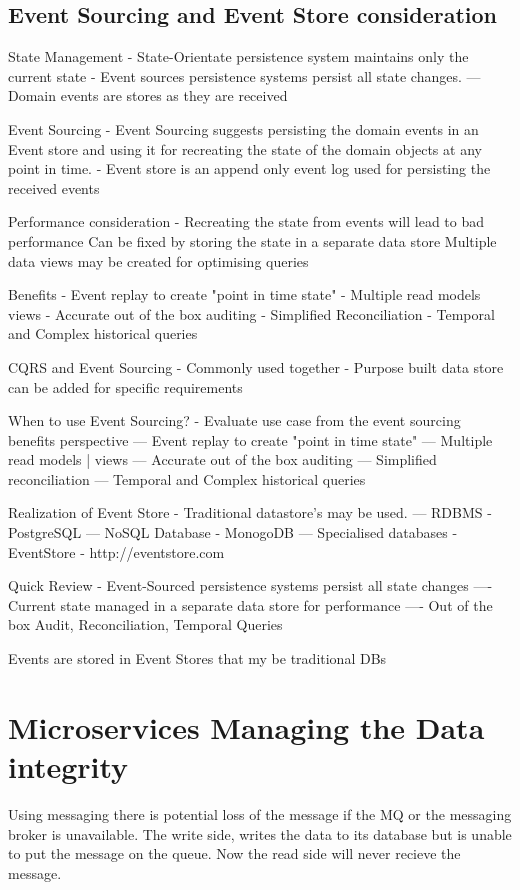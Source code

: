 \documentclass[a4paper, 11pt]{book}
\begin{document}


    \section{Event Sourcing and Event Store consideration}

    State Management
    - State-Orientate persistence system maintains only the current state
    - Event sources persistence systems persist all state changes.
    --- Domain events are stores as they are received

    Event Sourcing
    - Event Sourcing suggests persisting the domain events in an Event store and using it for recreating the state of the domain objects at any point in time.
    - Event store is an append only event log used for persisting the received events

    Performance consideration - Recreating the state from events will lead to bad performance
    Can be fixed by storing the state in a separate data store
    Multiple data views may be created for optimising queries

    Benefits
    - Event replay to create "point in time state"
    - Multiple read models views
    - Accurate out of the box auditing
    - Simplified Reconciliation
    - Temporal and Complex historical queries

    CQRS and Event Sourcing
    - Commonly used together
    - Purpose built data store can be added for specific requirements

    When to use Event Sourcing?
    - Evaluate use case from the event sourcing benefits perspective
    --- Event replay to create "point in time state"
    --- Multiple read models | views
    --- Accurate out of the box auditing
    --- Simplified reconciliation
    --- Temporal and Complex historical queries

    Realization of Event Store
    - Traditional datastore's may be used.
    --- RDBMS - PostgreSQL
    --- NoSQL Database - MonogoDB
    --- Specialised databases - EventStore - http://eventstore.com

    Quick Review
    - Event-Sourced persistence systems persist all state changes
    ---- Current state managed in a separate data store for performance
    ---- Out of the box Audit, Reconciliation, Temporal Queries

    Events are stored in Event Stores that my be traditional DBs


    \chapter{Microservices Managing the Data integrity}
    Using messaging there is potential loss of the message if the MQ or the messaging broker is unavailable.
    The write side, writes the data to its database but is unable to put the message on the queue.
    Now the read side will never recieve the message.
\end{document}
